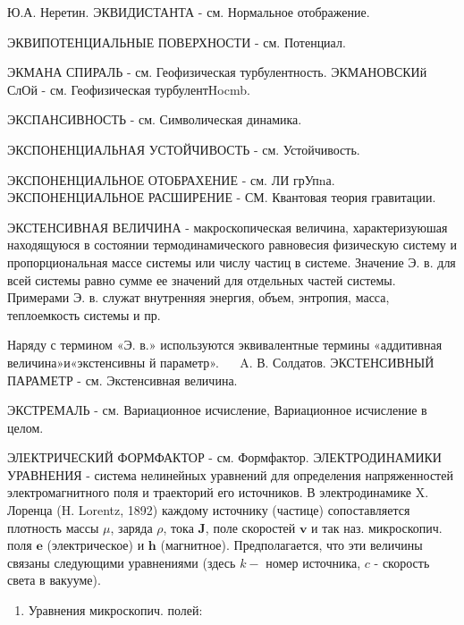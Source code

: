\documentclass[10pt]{article}
\begin{document}
Ю.А. Неретин. ЭКВИДИСТАНТА - см. Нормальное отображение.



ЭКВИПОТЕНЦИАЛЬНЫЕ ПОВЕРХНОСТИ - см. Потенциал.



ЭКМАНА СПИРАЛЬ - см. Геофизическая турбулентность. ЭКМАНОВСКИй СлОй - см. Геофизическая турбулентHocmb.



ЭКСПАНСИВНОСТЬ - см. Символическая динамика.



ЭКСПОНЕНЦИАЛЬНАЯ УСТОЙЧИВОСТЬ - см. Устойчивость.



ЭКСПОНЕНЦИАЛЬНОЕ ОТОБРАХЕНИЕ - см. ЛИ грУпnа. ЭКСПОНЕНЦИАЛЬНОЕ РАСШИРЕНИЕ - СМ. Квантовая теория гравитации.



ЭКСТЕНСИВНАЯ ВЕЛИЧИНА - макроскопическая величина, характеризуюшая находящуюся в состоянии термодинамического равновесия физическую систему и пропорциональная массе системы или числу частиц в системе. Значение Э. в. для всей системы равно сумме ее значений для отдельных частей системы. Примерами Э. в. служат внутренняя энергия, объем, энтропия, масса, теплоемкость системы и пр.



Наряду с термином «Э. в.» используются эквивалентные термины «аддитивная величина»и«экстенсивны й параметр». $\quad$ A. В. Солдатов. ЭКСТЕНСИВНЫЙ ПАРАМЕТР - см. Экстенсивная величина.



ЭКСТРЕМАЛЬ - см. Вариационное исчисление, Вариационное исчисление в целом.



ЭЛЕКТРИЧЕСКИЙ ФОРМФАКТОР - см. Формфактор. ЭЛЕКТРОДИНАМИКИ УРАВНЕНИЯ - система нелинейных уравнений для определения напряженностей электромагнитного поля и траекторий его источников. В электродинамике X. Лоренца (H. Lorentz, 1892) каждому источнику (частице) сопоставляется плотность массы $\mu$, заряда $\rho$, тока $\boldsymbol{J}$, поле скоростей $\boldsymbol{v}$ и так наз. микроскопич. поля $\boldsymbol{e}$ (электрическое) и $\boldsymbol{h}$ (магнитное). Предполагается, что эти величины связаны следующими уравнениями (здесь $k-$ номер источника, $c$ - скорость света в вакууме).



\begin{enumerate}

  \item Уравнения микроскопич. полей:

\end{enumerate}
\end{document}
